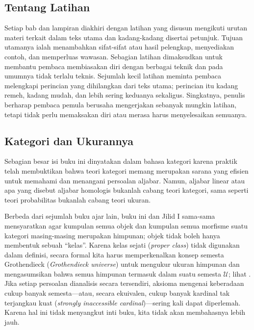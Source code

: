 \subsection*{Tentang Latihan}

Setiap bab dan lampiran diakhiri dengan latihan yang disusun mengikuti
urutan materi terkait dalam teks utama dan kadang-kadang disertai petunjuk.
Tujuan utamanya ialah menambahkan sifat-sifat atau hasil pelengkap,
menyediakan contoh, dan
memperluas wawasan. Sebagian latihan dimaksudkan untuk membantu pembaca
membiasakan diri dengan berbagai teknik dan pada umumnya tidak terlalu
teknis. Sejumlah kecil latihan meminta pembaca melengkapi perincian yang
dihilangkan dari teks utama; perincian itu kadang remeh, kadang mudah, dan
lebih sering keduanya sekaligus. Singkatnya, penulis berharap pembaca
pemula berusaha mengerjakan sebanyak mungkin latihan, tetapi tidak perlu
memaksakan diri atau merasa harus menyelesaikan semuanya.

\subsection*{Kategori dan Ukurannya}

Sebagian besar isi buku ini dinyatakan dalam bahasa kategori karena
praktik telah membuktikan bahwa teori kategori memang merupakan sarana
yang efisien untuk memahami dan menangani persoalan aljabar. Namun,
aljabar linear atau apa yang disebut aljabar homologis bukanlah cabang
teori kategori, sama seperti teori probabilitas bukanlah cabang teori
ukuran.

Berbeda dari sejumlah buku ajar lain, buku ini dan Jilid I sama-sama
mensyaratkan agar kumpulan semua objek dan kumpulan semua morfisme suatu
kategori masing-masing merupakan himpunan; objek tidak boleh hanya
membentuk sebuah ``kelas''. Karena kelas sejati
(\emph{proper class}) tidak digunakan dalam definisi, secara formal kita harus memperkenalkan
konsep semesta Grothendieck (\emph{Grothendieck universe}) untuk mengukur
ukuran himpunan dan mengasumsikan bahwa semua himpunan termasuk dalam
suatu semesta $\mathcal{U}$; lihat
\cite[Asumsi~1.5.2, Catatan~1.5.6]{Li1}. Jika setiap persoalan dianalisis
secara tersendiri, aksioma mengenai keberadaan cukup banyak semesta---atau,
secara ekuivalen, cukup banyak kardinal tak terjangkau kuat
(\emph{strongly inaccessible cardinal})---sering kali dapat diperlemah.
Karena hal ini tidak menyangkut inti buku, kita tidak akan membahasnya
lebih jauh.

